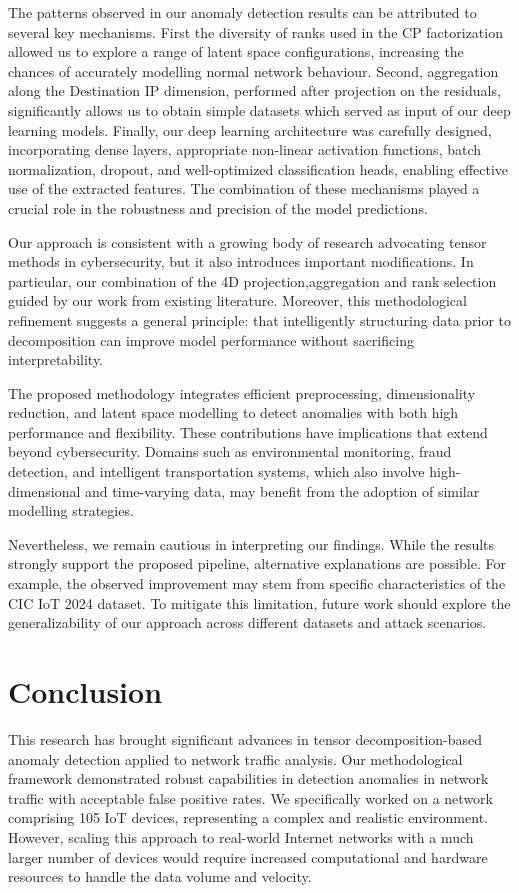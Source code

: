 \documentclass{ieeeaccess}
\begin{document}
The patterns observed in our anomaly detection results can be attributed to several key mechanisms. First the diversity of ranks used in the CP factorization allowed us to explore a range of latent space configurations, increasing the chances of accurately modelling normal network behaviour. Second, aggregation along the Destination IP dimension, performed after projection on the residuals, significantly allows us to obtain simple datasets which served as input of our deep learning models. Finally, our deep learning architecture was carefully designed, incorporating dense layers, appropriate non-linear activation functions, batch normalization, dropout, and well-optimized classification heads, enabling effective use of the extracted features. The combination of these mechanisms played a crucial role in the robustness and precision of the model predictions.

Our approach is consistent with a growing body of research advocating tensor methods in cybersecurity, but it also introduces important modifications. In particular, our combination of the 4D projection,aggregation and rank  selection guided by  our work from existing literature. Moreover, this methodological refinement suggests a general principle: that intelligently structuring data prior to decomposition can improve model performance without sacrificing interpretability.

The proposed methodology integrates efficient preprocessing, dimensionality reduction, and latent space modelling to detect anomalies with both high performance and flexibility. These contributions have implications that extend beyond cybersecurity. Domains such as environmental monitoring, fraud detection, and intelligent transportation systems, which also involve high-dimensional and time-varying data, may benefit from the adoption of similar modelling strategies.



Nevertheless, we remain cautious in interpreting our findings. While the results strongly support the proposed pipeline, alternative explanations are possible. For example, the observed improvement may stem from specific characteristics of the CIC IoT 2024 dataset. To mitigate this limitation, future work should explore the generalizability of our approach across different datasets and attack scenarios.

\section{Conclusion}
This research has brought significant advances in tensor decomposition-based anomaly detection applied to network traffic analysis. Our methodological framework demonstrated robust capabilities in  detection anomalies in network traffic with acceptable false positive rates. We specifically worked on a network comprising 105 IoT devices, representing a complex and realistic environment. However, scaling this approach to real-world Internet networks with a much larger number of devices would require increased computational and hardware resources to handle the data volume and velocity. 
\end{document}
